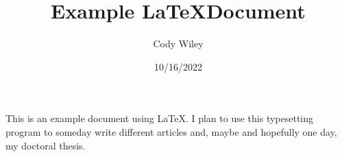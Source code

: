 \documentclass[12pt, a4paper]{article}
\begin{document}
\title{Example \LaTeX Document}
\author{Cody Wiley}
\date{10/16/2022}
\maketitle

This is an example document using \LaTeX. I plan to use this typesetting program to someday write different articles and, maybe and hopefully one day, my doctoral thesis.
\end{document}
